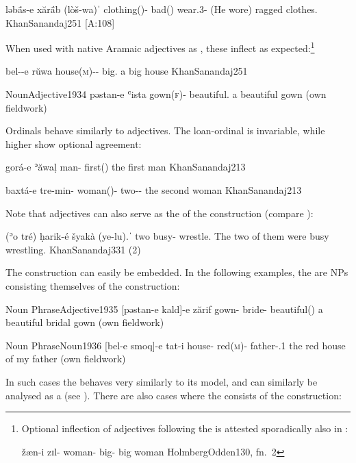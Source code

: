 {ləbā́s-e xărā́b (lòš-wa)ˈ}
{clothing(\masc)-\ez{} bad(\invar) wear.3\masc-\pst}
{(He wore) ragged clothes.}
{KhanSanandaj}{251 {[A:108]}}\antipar
\newpage 

 
When used with native Aramaic adjectives as \secns, these inflect as expected:\footnote{Optional inflection of adjectives following the \ez* is attested sporadically also in \Hawr: 

{žæn-i zɪl-}
{woman-\ez{} big-\opt\fem}
{big woman}
{HolmbergOdden}{130, fn.\ 2}\antipar
}

{bel--e rŭwa}
{house(\textsc{m})-\opt{\sg}-\ez{} big.\masc}
{a big house}
{KhanSanandaj}{251}

\acex
{Noun}{Adjective}{1934}
{pəstan-e ʿista}
{gown(\textsc{f})-\ez{} beautiful.\fem}
{a beautiful gown}
{}{(own fieldwork)}

Ordinals behave similarly to adjectives. The loan-ordinal  is invariable, while higher  show optional agreement:

{gorá-e ʾăwaḷ}
{man-\ez{} first(\invar)}
{the first man}
{KhanSanandaj}{213}



{baxtá-e tre-min-}
{woman(\fem)-\ez{} two-\ord-\opt\fem}
{the second woman}
{KhanSanandaj}{213}


Note that  adjectives can also serve as the \prim of the \ez* construction (compare ):

{(ʾo\cb{} tré) ḥarik-é šyakà (\cb{}ye-lu).ˈ}
{\cb{} two busy-\ez{} wrestle.\inf{} \cb{}\pl}
{The two of them were busy wrestling.}
{KhanSanandaj}{331 (2)}
\antipar
\newpage 

The \ez* construction can easily be embedded. In the following examples, the \prims are NPs consisting themselves of the \ez* construction:

\acex
{Noun Phrase}{Adjective}{1935}
{[pəstan-e kald]-e zărif}
{gown-\ez{} bride-\ez{} beautiful(\invar)}
{a beautiful bridal gown}
{}{(own fieldwork)}

\acex
{Noun Phrase}{Noun}{1936}
{[bel-e smoq]-e tat-i}
{house-\ez{} red(\textsc{m})-\ez{} father-\poss.1\sg}
{the red house of my father}
{}{(own fieldwork)}

In such cases the \ez* behaves very similarly to its \Per model, and can similarly be analysed as a  (see ). There are also cases where the \secn consists of the \ez* construction:

